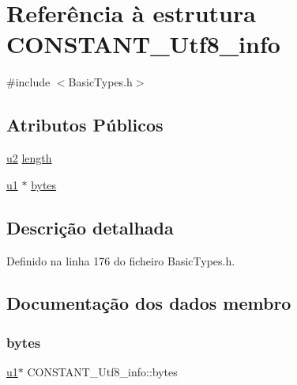 \hypertarget{structCONSTANT__Utf8__info}{}\section{Referência à estrutura C\+O\+N\+S\+T\+A\+N\+T\+\_\+\+Utf8\+\_\+info}
\label{structCONSTANT__Utf8__info}


{\ttfamily \#include $<$Basic\+Types.\+h$>$}

\subsection*{Atributos Públicos}
\begin{DoxyCompactItemize}
\item 
\hyperlink{BasicTypes_8h_a732cde1300aafb73b0ea6c2558a7a54f}{u2} \hyperlink{structCONSTANT__Utf8__info_a712975144ad624052a94f4a2ebdb954e}{length}
\item 
\hyperlink{BasicTypes_8h_ad9f4cdb6757615aae2fad89dab3c5470}{u1} $\ast$ \hyperlink{structCONSTANT__Utf8__info_a249f598c4ef4c5fd570377fe14672c38}{bytes}
\end{DoxyCompactItemize}


\subsection{Descrição detalhada}


Definido na linha 176 do ficheiro Basic\+Types.\+h.



\subsection{Documentação dos dados membro}
\mbox{\label{structCONSTANT__Utf8__info_a249f598c4ef4c5fd570377fe14672c38}} 
\subsubsection{\texorpdfstring{bytes}{bytes}}
{\footnotesize\ttfamily \hyperlink{BasicTypes_8h_ad9f4cdb6757615aae2fad89dab3c5470}{u1}$\ast$ C\+O\+N\+S\+T\+A\+N\+T\+\_\+\+Utf8\+\_\+info\+::bytes}



